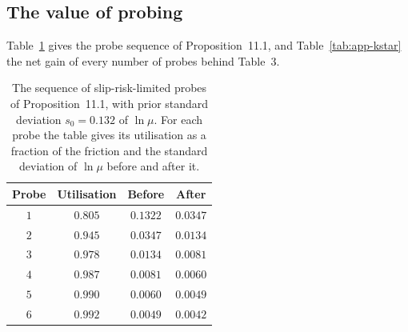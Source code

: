 \documentclass[12pt, twoside]{amsart}
\theoremstyle{definition}
\newcommand{\mainref}[2]{#2}
\begin{document}
\subsection{The value of probing}

Table~\ref{tab:app-ratchet} gives the probe sequence of Proposition~\mainref{prop:ratchet}{11.1}, and
Table~\ref{tab:app-kstar} the net gain of every number of probes behind Table~\mainref{tab:probes}{3}.

\begin{table}[htbp]
\centering\small
\caption{The sequence of slip-risk-limited probes of Proposition~\mainref{prop:ratchet}{11.1}, with prior standard deviation $s_0=0.132$ of $\ln\mu$. For each probe the table gives its utilisation as a fraction of the friction and the standard deviation of $\ln\mu$ before and after it.}\label{tab:app-ratchet}
\begin{tabular}{cccc}
\toprule
Probe & Utilisation & Before & After\\
\midrule
$1$ & $0.805$ & $0.1322$ & $0.0347$\\
$2$ & $0.945$ & $0.0347$ & $0.0134$\\
$3$ & $0.978$ & $0.0134$ & $0.0081$\\
$4$ & $0.987$ & $0.0081$ & $0.0060$\\
$5$ & $0.990$ & $0.0060$ & $0.0049$\\
$6$ & $0.992$ & $0.0049$ & $0.0042$\\
\bottomrule
\end{tabular}
\end{table}
\end{document}
